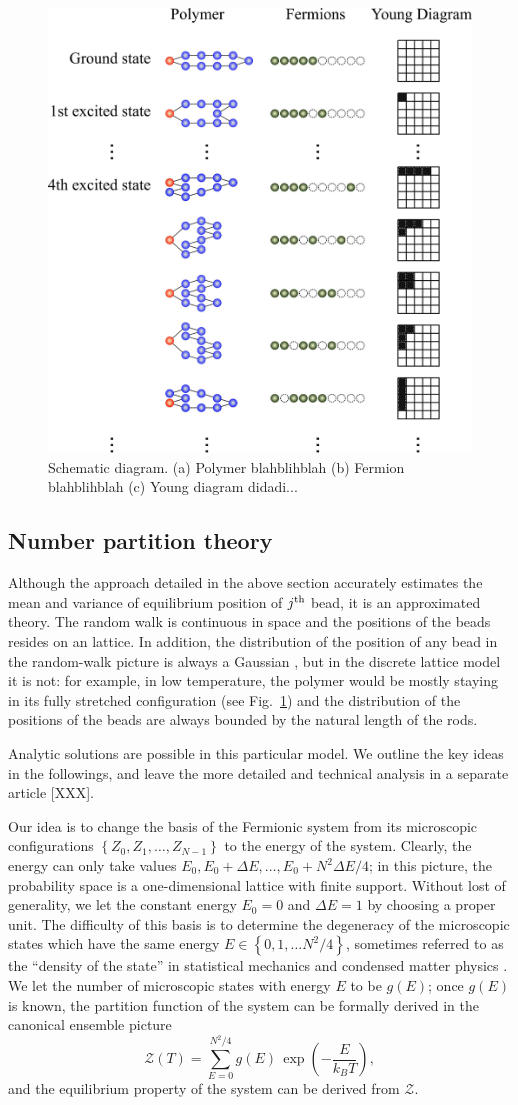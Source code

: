 \documentclass[aps,showpacs,twocolumn,floatfix,prx,superscriptaddress]{revtex4-1}
\begin{document}
\begin{figure}
\includegraphics[width=0.45 \textwidth]{schematic}
\caption{Schematic diagram. (a) Polymer blahblihblah (b) Fermion blahblihblah (c) Young diagram didadi...}
\label{fig:schematic}
\end{figure}

\subsection{Number partition theory} 
Although the approach detailed in the above section accurately estimates
the mean and variance of equilibrium position of $j^{\rm th}$ bead, it is an
approximated theory. The random walk is continuous in space and the positions of
the beads resides on an lattice. In addition, the distribution of the position
of any bead in the random-walk picture is always a Gaussian
\cite{}, but in the discrete lattice model it is not:
for example, in low temperature, the polymer would be mostly staying in its
fully stretched configuration (see Fig.~\ref{fig:schematic}) and the
distribution of the positions of the beads are always bounded by the natural
length of the rods. 

Analytic solutions are possible in this particular model. We outline the key
ideas in the followings, and leave the more detailed and technical analysis in a
separate article [XXX]. 

Our idea is to change the basis of the Fermionic system from its microscopic
configurations $\left\{Z_0,Z_1,\ldots,Z_{N-1}\right\}$ to the energy of the system.
Clearly, the energy can only take values $E_0, E_0+\Delta E, \ldots, E_0 + N^2
\Delta E / 4$; in this picture, the probability space is a one-dimensional
lattice with finite support. Without lost of generality, we let the constant
energy $E_0=0$ and $\Delta E=1$ by choosing a proper unit. The difficulty of
this basis is to determine the degeneracy of the microscopic states which have
the same energy $E \in \left\{0,1,\ldots N^2/4\right\}$, sometimes referred to as the
``density of the state'' in statistical mechanics \cite{}
and condensed matter physics \cite{}. We let the number of
microscopic states with energy $E$ to be $g(E)$; once $g(E)$ is known, the
partition function of the system can be formally derived in the canonical
ensemble picture
\begin{equation}
    \label{partition_func}
    \mathcal{Z}\left(T\right) = \sum_{E=0}^{N^2/4} g(E) \, \exp
    \left(-\frac{E}{k_B T}\right),
\end{equation}
and the equilibrium property of the system can be derived from $\mathcal{Z}$. 
\end{document}
